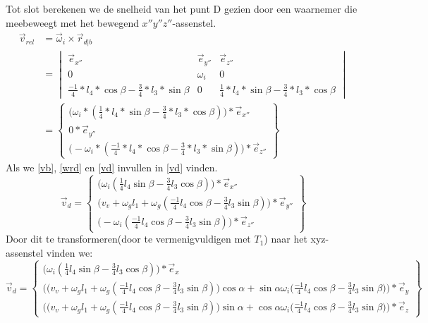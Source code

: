 \documentclass[a4paper,10pt]{article}
\begin{document}
Tot slot berekenen we de snelheid van het punt D gezien door een waarnemer die meebeweegt met het bewegend $x''y''z''$-assenstel.\\
\begin{equation}
\label{vrel}
\begin{aligned}
\vec{v}_{rel} &= \vec{\omega}_i \times \vec{r}_{d|b} \\
&=\begin{vmatrix}
\vec{e}_{x''} & \vec{e}_{y''} & \vec{e}_{z''}\\
0 & \omega_i & 0 \\
\frac{-1}{4}*l_4*\cos{\beta} - \frac{3}{4}*l_3 * \sin{\beta} & 0 &\frac{1}{4}*l_4 *\sin{\beta}-\frac{3}{4}*l_3 * \cos{\beta}
\end{vmatrix}\\
&= \begin{Bmatrix}
\Big(\omega_i * (\frac{1}{4}*l_4 *\sin{\beta}-\frac{3}{4}*l_3 * \cos{\beta})\Big) * \vec{e}_{x''}\\
0 *\vec{e}_{y''}\\
\Big(-\omega_i *(\frac{-1}{4}*l_4*\cos{\beta} - \frac{3}{4}*l_3 * \sin{\beta}) \Big)*\vec{e}_{z''}
\end{Bmatrix}
\end{aligned}
\end{equation}
Als we \ref{vb}, \ref{wrd} en \ref{vd} invullen in \ref{vd} vinden.\\
\begin{equation}
\vec{v}_d = \begin{Bmatrix}
\Big(\omega_i (\frac{1}{4} l_4 \sin{\beta}-\frac{3}{4} l_3  \cos{\beta})\Big) * \vec{e}_{x''}\\
\Big(v_v + \omega_g  l_1 + \omega_g (\frac{-1}{4} l_4 \cos{\beta}-\frac{3}{4} l_3 \sin{\beta}) \Big) *\vec{e}_{y''}\\
\Big(-\omega_i (\frac{-1}{4} l_4 \cos{\beta} - \frac{3}{4} l_3  \sin{\beta}) \Big)*\vec{e}_{z''}
\end{Bmatrix}
\end{equation}
Door dit te transformeren(door te vermenigvuldigen met $T_1$) naar het xyz-assenstel vinden we: \\
\begin{equation}
\vec{v}_d = \begin{Bmatrix}
\Big(\omega_i  (\frac{1}{4}l_4 \sin{\beta}-\frac{3}{4}l_3  \cos{\beta})\Big) * \vec{e}_{x}\\
\Big(\big(v_v + \omega_g  l_1 + \omega_g(\frac{-1}{4} l_4 \cos{\beta}-\frac{3}{4} l_3 \sin{\beta}) \big) \cos{\alpha}  + \sin{\alpha}  \omega_i  \big( \frac{-1}{4}l_4 \cos{\beta} - \frac{3}{4}l_3 \sin{\beta}\big)\Big)*\vec{e}_{y} \\
\Big(\big(v_v + \omega_g   l_1 + \omega_g (\frac{-1}{4} l_4 \cos{\beta}-\frac{3}{4} l_3 \sin{\beta}) \big) \sin{\alpha}  + \cos{\alpha}  \omega_i   \big( \frac{-1}{4} l_4 \cos{\beta} - \frac{3}{4}l_3 \sin{\beta}\big)\Big)*\vec{e}_{z}
\end{Bmatrix}
\end{equation}\\
\end{document}
